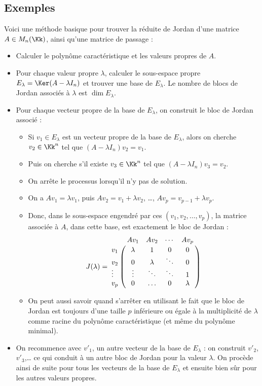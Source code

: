 \documentclass[12pt, class=report,crop=false]{standalone}
\begin{document}
\subsection{Exemples}

Voici une méthode basique pour trouver la réduite de Jordan d'une matrice $A \in M_n(\Kk)$, 
ainsi qu'une matrice de passage :

\begin{itemize}
  \item Calculer le polynôme caractéristique et les valeurs propres de $A$.
  
  \item Pour chaque valeur propre $\lambda$, calculer le sous-espace propre
  $E_\lambda = \Ker(A-\lambda I_n)$ et trouver une base de $E_\lambda$.
  Le nombre de blocs de Jordan associés à $\lambda$ est $\dim E_\lambda$.
    
  \item Pour chaque vecteur propre de la base de $E_\lambda$, on construit le bloc de Jordan associé :
  \begin{itemize}
      \item Si $v_1 \in E_\lambda$ est un vecteur propre de la base de $E_\lambda$, alors on cherche
  $v_2 \in \Kk^n$ tel que $(A-\lambda I_n)v_2 = v_1$. 
      \item Puis on cherche s'il existe
  $v_3 \in \Kk^n$ tel que $(A-\lambda I_n)v_3 = v_2$.
      \item On arrête le processus lorsqu'il n'y pas de solution. 
      \item On a $Av_1 = \lambda v_1$, puis $Av_2 = v_1 + \lambda v_2$, \ldots,
  $Av_p = v_{p-1} + \lambda v_p$. 
      \item Donc, dans le sous-espace engendré par ces $(v_1,v_2,\ldots,v_p)$, la matrice associée à $A$, dans cette base, est exactement le bloc de Jordan :
  $$J(\lambda) = 
  \bordermatrix{
     & Av_1    & Av_2 & \cdots & Av_p \cr
  v_1& \lambda&1&0&0 \cr
  v_2& 0&\lambda&\ddots&0\cr
   \vdots  & \vdots&\ddots&\ddots&1 \cr
  v_p& 0&\ldots&0&\lambda }
  $$ 
  
      \item On peut aussi savoir quand s'arrêter en utilisant le fait que le bloc de Jordan est toujours d'une taille $p$ inférieure ou égale à la multiplicité de $\lambda$
  comme racine du polynôme caractéristique (et même du polynôme minimal).
  \end{itemize}
  
  
  \item On recommence avec $v'_1$, un autre vecteur de la base de $E_\lambda$ : on construit $v'_2$, $v'_3$,\ldots{} ce qui conduit à un autre bloc de Jordan pour la valeur $\lambda$. On procède ainsi de suite pour tous les vecteurs de la base de $E_\lambda$ et ensuite bien sûr pour les autres valeurs propres. 
\end{itemize}  
 
\end{document}
